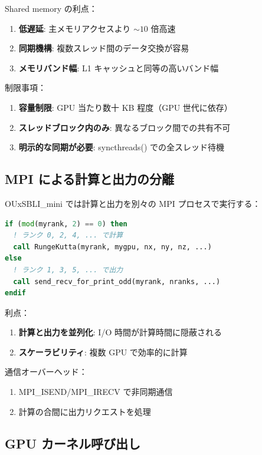 Shared memory の利点：

\begin{enumerate}
  \item \textbf{低遅延}: 主メモリアクセスより $\sim 10$ 倍高速
  \item \textbf{同期機構}: 複数スレッド間のデータ交換が容易
  \item \textbf{メモリバンド幅}: L1 キャッシュと同等の高いバンド幅
\end{enumerate}

制限事項：

\begin{enumerate}
  \item \textbf{容量制限}: GPU 当たり数十 KB 程度（GPU 世代に依存）
  \item \textbf{スレッドブロック内のみ}: 異なるブロック間での共有不可
  \item \textbf{明示的な同期が必要}: syncthreads() での全スレッド待機
\end{enumerate}

\subsection{MPI による計算と出力の分離}

OUxSBLI\_mini では計算と出力を別々の MPI プロセスで実行する：

\begin{lstlisting}[language=Fortran]
if (mod(myrank, 2) == 0) then
  ! ランク 0, 2, 4, ... で計算
  call RungeKutta(myrank, mygpu, nx, ny, nz, ...)
else
  ! ランク 1, 3, 5, ... で出力
  call send_recv_for_print_odd(myrank, nranks, ...)
endif
\end{lstlisting}

利点：

\begin{enumerate}
  \item \textbf{計算と出力を並列化}: I/O 時間が計算時間に隠蔽される
  \item \textbf{スケーラビリティ}: 複数 GPU で効率的に計算
\end{enumerate}

通信オーバーヘッド：

\begin{enumerate}
  \item MPI\_ISEND/MPI\_IRECV で非同期通信
  \item 計算の合間に出力リクエストを処理
\end{enumerate}

\subsection{GPU カーネル呼び出し}

